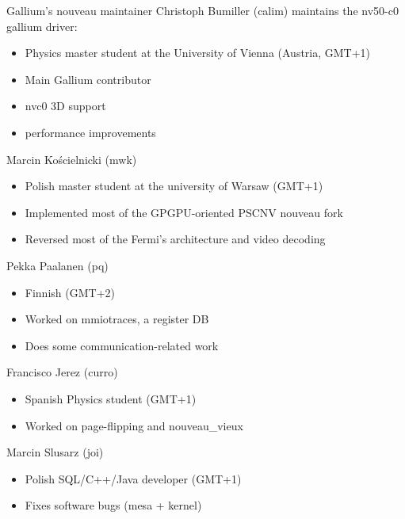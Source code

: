 \documentclass[11pt,english,compress]{beamer}
\begin{document}
		\begin{frame}
			\begin{block}{Gallium's nouveau maintainer}
				Christoph Bumiller (calim) maintains the nv50-c0 gallium driver:
				\begin{itemize}
					\item Physics master student at the University of Vienna (Austria, GMT+1)
					\item Main Gallium contributor
					\item nvc0 3D support
					\item performance improvements
				\end{itemize}
			\end{block}

			\begin{block}{Marcin Kościelnicki (mwk)}
				\begin{itemize}
					\item Polish master student at the university of Warsaw (GMT+1)
					\item Implemented most of the GPGPU-oriented PSCNV nouveau fork
					\item Reversed most of the Fermi's architecture and video decoding
				\end{itemize}
			\end{block}
		\end{frame}

		\begin{frame}
			\begin{block}{Pekka Paalanen (pq)}
				\begin{itemize}
					\item Finnish (GMT+2)
					\item Worked on mmiotraces, a register DB
					\item Does some communication-related work
				\end{itemize}
			\end{block}

			\begin{block}{Francisco Jerez (curro)}
				\begin{itemize}
					\item Spanish Physics student (GMT+1)
					\item Worked on page-flipping and nouveau\_vieux
				\end{itemize}
			\end{block}

			\begin{block}{Marcin Slusarz (joi)}
				\begin{itemize}
					\item Polish SQL/C++/Java developer (GMT+1)
					\item Fixes software bugs (mesa + kernel)
				\end{itemize}
			\end{block}
		\end{frame}
\end{document}
